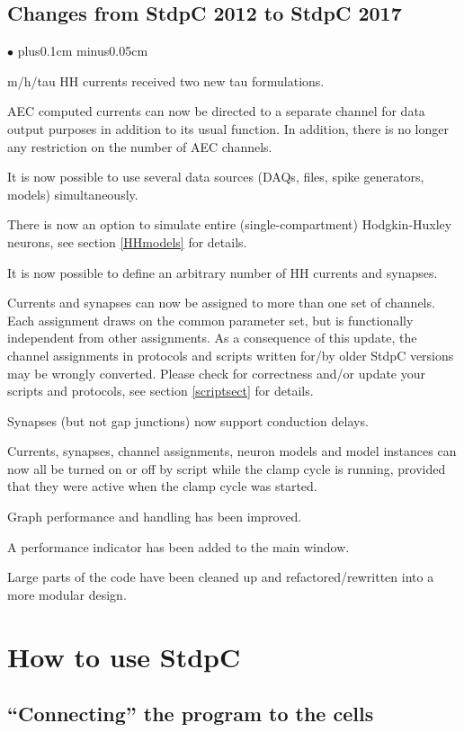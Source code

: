 \documentclass{article}
\newenvironment{myitem}{\begin{list}{$\bullet$}{\setlength{\leftmargin}{1.1em}
\itemsep0.1cm plus0.1cm minus0.05cm
\listparindent0cm
\addtolength{\labelsep}{0.5\labelsep}
\setlength{\labelwidth}{0.8em}
\setlength{\leftmargin}{\labelwidth}
\addtolength{\leftmargin}{\labelsep}
}}{\end{list}}
\begin{document}
\subsection{Changes from StdpC 2012 to StdpC 2017}
\begin{myitem}
\item m/h/tau HH currents received two new tau formulations.
\item AEC computed currents can now be directed to a separate channel for data output
 purposes in addition to its usual function. In addition, there is no longer any restriction
 on the number of AEC channels.
\item It is now possible to use several data sources (DAQs, files, spike generators, models) simultaneously.
\item There is now an option to simulate entire (single-compartment) Hodgkin-Huxley neurons, see
 section \ref{HHmodels} for details.
\item It is now possible to define an arbitrary number of HH currents and synapses.
\item Currents and synapses can now be assigned to more than one set of channels.
 Each assignment draws on the common parameter set, but is functionally independent
 from other assignments. As a consequence of this update, the channel assignments
 in protocols and scripts written for/by older StdpC versions may be wrongly converted.
 Please check for correctness and/or update your scripts and protocols, see section \ref{scriptsect} for details.
\item Synapses (but not gap junctions) now support conduction delays.
\item Currents, synapses, channel assignments, neuron models and model instances can now all be
 turned on or off by script while the clamp cycle is running, provided that they were active when
 the clamp cycle was started.
\item Graph performance and handling has been improved.
\item A performance indicator has been added to the main window.
\item Large parts of the code have been cleaned up and refactored/rewritten into a more modular design.
\end{myitem}

\section{How to use StdpC}

\subsection{``Connecting'' the program to the cells}
 
\end{document}
